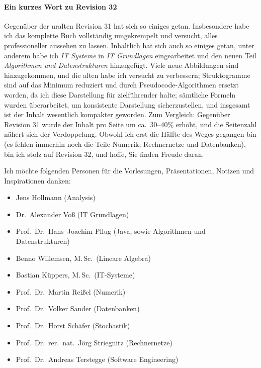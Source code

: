 \documentclass[english,ngerman,fontsize=9pt,intoc,index=totoc,refpage,listof=totoc,draft]{scrbook}
\numberwithin{equation}{section}
\begin{document}
\paragraph*{Ein kurzes Wort zu Revision 32}
Gegenüber der uralten Revision 31 hat sich so einiges getan.
Insbesondere habe ich das komplette Buch vollständig umgekrempelt und versucht, alles professioneller aussehen zu lassen.
Inhaltlich hat sich auch so einiges getan, unter anderem habe ich \emph{IT Systeme} in \emph{IT Grundlagen} eingearbeitet und den neuen Teil \emph{Algorithmen und Datenstrukturen} hinzugefügt.
Viele neue Abbildungen sind hinzugekommen, und die alten habe ich versucht zu verbessern; Struktogramme sind auf das Minimum reduziert und durch Pseudocode-Algorithmen ersetzt worden, da ich diese Darstellung für zielführender halte; sämtliche Formeln wurden überarbeitet, um konsistente Darstellung sicherzustellen, und insgesamt ist der Inhalt wesentlich kompakter geworden.
Zum Vergleich: Gegenüber Revision 31 wurde der Inhalt pro Seite um ca.~30--40\% erhöht, und die Seitenzahl nähert sich der Verdoppelung.
Obwohl ich erst die Hälfte des Weges gegangen bin (es fehlen immerhin noch die Teile Numerik, Rechnernetze und Datenbanken), bin ich stolz auf Revision 32, und hoffe, Sie finden Freude daran.






Ich möchte folgenden Personen für die Vorlesungen, Präsentationen, Notizen und Inspirationen danken:
\begin{itemize}
  \item Jens Hollmann (Analysis)
  \item Dr.~Alexander Voß (IT Grundlagen)
  \item Prof.~Dr.~Hans~Joachim Pflug (Java, sowie Algorithmen und Datenstrukturen)
  \item Benno Willemsen, M.\,Sc.\ (Lineare Algebra)
  \item Bastian Küppers, M.\,Sc.\ (IT-Systeme)
  \item Prof.~Dr.~Martin Reißel (Numerik)
  \item Prof.~Dr.~Volker Sander (Datenbanken)
  \item Prof.~Dr.~Horst Schäfer (Stochastik)
  \item Prof.~Dr.~rer.~nat.~Jörg Striegnitz (Rechnernetze)
  \item Prof.~Dr.~Andreas Terstegge (Software Engineering)
\end{itemize}
\end{document}
